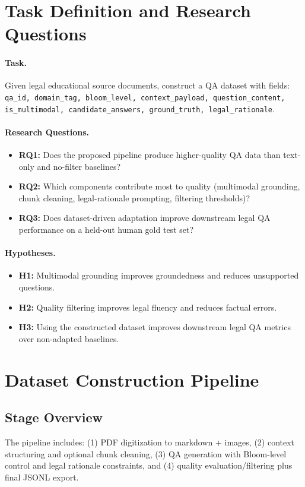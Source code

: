 \section{Task Definition and Research Questions}
\label{sec:task_rq}
\paragraph{Task.}
Given legal educational source documents, construct a QA dataset with fields:
\texttt{qa\_id, domain\_tag, bloom\_level, context\_payload, question\_content, is\_multimodal, candidate\_answers, ground\_truth, legal\_rationale}.

\paragraph{Research Questions.}
\begin{itemize}
\item \textbf{RQ1:} Does the proposed pipeline produce higher-quality QA data than text-only and no-filter baselines?
\item \textbf{RQ2:} Which components contribute most to quality (multimodal grounding, chunk cleaning, legal-rationale prompting, filtering thresholds)?
\item \textbf{RQ3:} Does dataset-driven adaptation improve downstream legal QA performance on a held-out human gold test set?
\end{itemize}

\paragraph{Hypotheses.}
\begin{itemize}
\item \textbf{H1:} Multimodal grounding improves groundedness and reduces unsupported questions.
\item \textbf{H2:} Quality filtering improves legal fluency and reduces factual errors.
\item \textbf{H3:} Using the constructed dataset improves downstream legal QA metrics over non-adapted baselines.
\end{itemize}

\section{Dataset Construction Pipeline}
\label{sec:pipeline}
\subsection{Stage Overview}
The pipeline includes: (1) PDF digitization to markdown + images, (2) context structuring and optional chunk cleaning, (3) QA generation with Bloom-level control and legal rationale constraints, and (4) quality evaluation/filtering plus final JSONL export.

